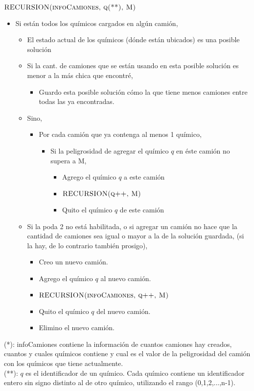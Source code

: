 \noindent
$\textnormal{\scshape RECURSION(infoCamiones, q(**), M)}$
\begin{itemize}
\item Si est\'an todos los qu\'imicos cargados en alg\'un cami\'on,							
	\begin{itemize}
	\item El estado actual de los qu\'imicos (d\'onde est\'an ubicados) es una posible soluci\'on
	\item Si la cant. de camiones que se est\'an usando en esta posible soluci\'on es menor a la m\'as chica que encontr\'e,
		\begin{itemize}
		\item Guardo esta posible soluci\'on c\'omo la que tiene menos camiones entre todas las ya encontradas.
		\end{itemize}																												
	\item Sino,
		\begin{itemize}
		\item Por cada cami\'on que ya contenga al menos 1 qu\'imico,									
			\begin{itemize}
			\item Si la peligrosidad de agregar el qu\'imico $q$ en \'este cami\'on no supera a M,
				\begin{itemize}
				\item Agrego el qu\'imico $q$ a este cami\'on
				\item $\textnormal{\scshape RECURSION(q++, M)}$
				\item Quito el qu\'imico $q$ de este cami\'on
				\end{itemize}
			\end{itemize}		
		\end{itemize}
		\item Si la poda 2 no est\'a habilitada, o si agregar un cami\'on no hace que la cantidad de camiones sea igual o mayor a la de la soluci\'on guardada, (si la hay, de lo contrario tambi\'en prosigo),
		\begin{itemize}
			\item Creo un nuevo cami\'on.
			\item Agrego el qu\'imico $q$ al nuevo cami\'on.
			\item $\textnormal{\scshape RECURSION(infoCamiones, q++, M)}$	
			\item Quito el qu\'imico $q$ del nuevo cami\'on.
			\item Elimino el nuevo cami\'on.
		\end{itemize}
	\end{itemize}			
\end{itemize}
\bigskip
\noindent
(*): infoCamiones contiene la informaci\'on de cuantos camiones hay creados, cuantos y cuales qu\'imicos contiene y cual es el valor de la peligrosidad del cami\'on con los qu\'imicos que tiene actualmente. \\
(**): $q$ es el identificador de un qu\'imico. Cada qu\'imico contiene un identificador entero sin signo distinto al de otro qu\'imico, utilizando el rango (0,1,2,...,n-1).
\bigskip
\bigskip

